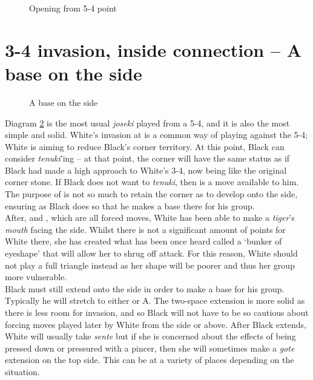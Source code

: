 \documentclass[a5paper,12pt,twoside]{book} %
\newcounter{joseki}                 %
\newcommand{\dref}[1]{Diagram \ref{#1}}
\newcommand{\addstufftotoc}[2][toc]{%
  \addtocontents{#1}{#2}}
\begin{document}
\begin{figure}[!htbp]
 
\vspace{-0.6cm}\caption{Opening from 5-4 point}
\label{5-4:options}
\end{figure}

\section{3-4 invasion, inside connection – A base on the side}

\begin{figure}[!htbp]
 
\vspace{-0.6cm}\caption{A base on the side}
\label{5-4:peace}
\end{figure}

\addstufftotoc{\nobreak\smallskip\protect\par}

\dref{5-4:peace} is the most usual \textit{joseki} played from a 5-4, and it is also the most simple and solid. White's invasion at{\large\whitestone[1]} is a common way of playing against the 5-4; White is aiming to reduce Black's corner territory. At this point, Black can consider \textit{tenuki}'ing – at that point, the corner will have the same status as if Black had made a high approach to White's 3-4,{\large\whitestone[1]} now being like the original corner stone. If Black does not want to \textit{tenuki}, then{\large\blackstone[2]} is a move available to him. The purpose of{\large\blackstone[2]} is not so much to retain the corner as to develop onto the side, ensuring as Black does so that he makes a base there for his group.\\

After{\large\whitestone[3]},{\large\blackstone[4]} and {\large\whitestone[5]}, which are all forced moves, White has been able to make a \textit{tiger}’s \textit{mouth} facing the side. Whilst there is not a significant amount of points for White there, she has created what has been once heard called a `bunker of eyeshape' that will allow her to shrug off attack. For this reason, White should not play a full triangle instead as her shape will be poorer and thus her group more vulnerable.\\

Black must still extend onto the side in order to make a base for his group. Typically he will stretch to either{\large\blackstone[6]} or A. The two-space extension is more solid as there is less room for invasion, and so Black will not have to be so cautious about forcing moves played later by White from the side or above. After Black extends, White will usually take \textit{sente} but if she is concerned about the effects of being pressed down or pressured with a pincer, then she will sometimes make a \textit{gote} extension on the top side. This can be at a variety of places depending on the situation.
\end{document}
